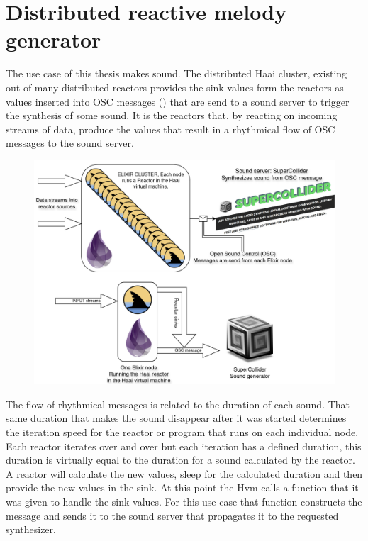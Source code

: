 \documentclass[a4paper]{book}
\begin{document}
\chapter{Distributed reactive melody generator}
The use case of this thesis makes sound. The distributed Haai cluster, existing out of many distributed reactors provides the sink values form the reactors as values inserted into OSC messages (\cite{schmeder2010best}) that are send to a sound server to trigger the synthesis of some sound. It is the reactors that, by reacting on incoming streams of data, produce the values that result in a rhythmical flow of OSC messages to the sound server. 

\begin{figure}[h]
	\includegraphics[width=\textwidth]{drmg200.drawio}
\end{figure}



 
The flow of rhythmical messages is related to the duration of each sound. That same duration that makes the sound disappear after it was started determines the iteration speed for the reactor or program that runs on each individual node. Each reactor iterates over and over but each iteration has a defined duration, this duration is virtually equal to the duration for a sound calculated by the reactor. A reactor will calculate the new values, sleep for the calculated duration and then provide the new values in the sink. At this point the Hvm calls a function that it was given to handle the sink values. For this use case that function constructs the message and sends it to the sound server that propagates it to the requested synthesizer. 
\end{document}
